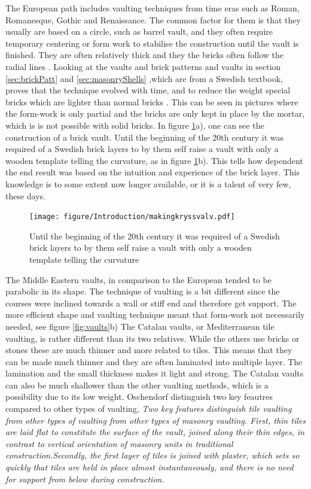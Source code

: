 The European path includes vaulting techniques from time eras such as Roman, Romanesque, Gothic and Renaissance. The common factor for them is that they usually are based on a circle, such as barrel vault, and they often require temporary centering or form work to stabilise the construction until the vault is finished. They are often relatively thick and they the bricks often follow the radial lines \cite{ref:Dieste}. Looking at the vaults and brick patterns and vaults in section \ref{sec:brickPatt} and \ref{sec:masonryShells} ,which are from a Swedish textbook, proves that the technique evolved with time, and to reduce the weight special bricks which are lighter than normal bricks \cite{ref:murning}. This can be seen in pictures where the form-work is only partial and the bricks are only kept in place by the mortar, which is is not possible with solid bricks. In figure \ref{fig:kryssvalv}a),  one can see the construction of a brick vault. Until the beginning of the 20th century it was required of a Swedish brick layers to by them self raise a vault with only a wooden template telling the curvature\cite{ref:murning}, as in figure \ref{fig:kryssvalv}b). This tells how dependent the end result was based on the intuition and experience of the brick layer. This knowledge is to some extent now longer available, or it is a talent of very few, these days.

\begin{figure}[H]
\centering
\texttt{[image: figure/Introduction/makingkryssvalv.pdf]}
\caption{Until the beginning of the 20th century it was required of a Swedish brick layers to by them self raise a vault with only a wooden template telling the curvature\cite{ref:murning}}
\label{fig:kryssvalv}
\end{figure}

The Middle Eastern vaults, in comparison to the European tended to be parabolic in its shape. The technique of vaulting is a bit different since the courses were inclined towards a wall or stiff end and therefore get support. The more efficient shape and vaulting technique meant that form-work not necessarily needed\cite{ref:Dieste}, see figure \ref{fig:vaults}b)
The Catalan vaults, or Mediterranean tile vaulting, is rather different than its two relatives. While the others use bricks or stones these are much thinner and more related to tiles. This means that they can be made much thinner and they are often laminated into multiple layer. The lamination and the small thickness makes it light and strong\cite{ref:Dieste}. The Catalan vaults can also be much shallower than the other vaulting methods, which is a possibility due to its low weight. Oschendorf distinguish two key feautres compared to other types of vaulting, \textit{ Two key features distinguish tile vaulting from other types of vaulting from other types of masonry vaulting. First, thin tiles are laid flat to constitute the surface of the vault, joined along their thin edges, in contrast to vertical orientation of masonry units in traditional construction.Secondly, the first layer of tiles is joined with plaster, which sets so quickly that tiles are held in place almost instantaneously, and there is no need for support from below during construction.}\cite{ref:Ochsendorf}
\vspace{5mm}


